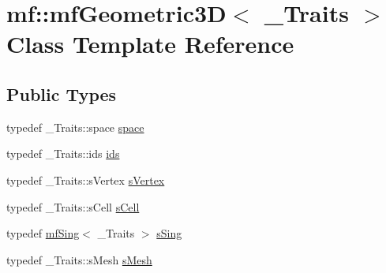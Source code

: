 \hypertarget{classmf_1_1mfGeometric3D}{
\section{mf::mfGeometric3D$<$ \_\-Traits $>$ Class Template Reference}
\label{classmf_1_1mfGeometric3D}
}
\subsection*{Public Types}
\begin{DoxyCompactItemize}
\item 
typedef \_\-Traits::space \hyperlink{classmf_1_1mfGeometric3D_ab732339c6fcfe15c8448a3e85409472d}{space}
\item 
typedef \_\-Traits::ids \hyperlink{classmf_1_1mfGeometric3D_a72458e2b6c0f4da54ce1498e93ccf7db}{ids}
\item 
typedef \_\-Traits::sVertex \hyperlink{classmf_1_1mfGeometric3D_a50cf9e6bef53ef5b1e90b89c577df8e7}{sVertex}
\item 
typedef \_\-Traits::sCell \hyperlink{classmf_1_1mfGeometric3D_a79853aff11a39a8fbbdc9c1a1bee5d6c}{sCell}
\item 
typedef \hyperlink{classmf_1_1mfSing}{mfSing}$<$ \_\-Traits $>$ \hyperlink{classmf_1_1mfGeometric3D_a5d8322e74d314f2616fbd140ee2616d3}{sSing}
\item 
typedef \_\-Traits::sMesh \hyperlink{classmf_1_1mfGeometric3D_a4eea019f02b26eb572858d3d2f5e04f2}{sMesh}
\end{DoxyCompactItemize}
